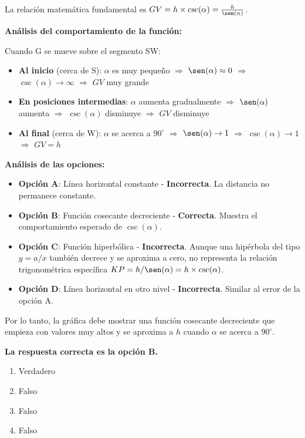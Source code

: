 \documentclass[10pt,a4paper]{article}
\makeatletter
\newenvironment{solution}{\comment}{\endcomment}
\newenvironment{answerlist}{\renewcommand{\labelenumii}{(\alph{enumii})}\begin{enumerate}}{\end{enumerate}}
\newcommand{\exname}[1]{\def\@exname{#1}}
\newcommand{\extype}[1]{\def\@extype{#1}}
\newcommand{\exsolution}[1]{\def\@exsolution{#1}}
\newcommand{\exshuffle}[1]{\def\@exshuffle{#1}}
\newcommand{\exsection}[1]{\def\@exsection{#1}}
\makeatother
\begin{document}
\begin{enumerate}
\begin{solution}

La relación matemática fundamental es $GV = h \times \csc(\alpha) = \frac{h}{\sen(\alpha)}$.

\textbf{Análisis del comportamiento de la función:}

Cuando G se mueve sobre el segmento SW:

\begin{itemize}
\item \textbf{Al inicio} (cerca de S): $\alpha$ es muy pequeño $\Rightarrow$ $\sen(\alpha) \approx 0$ $\Rightarrow$ $\csc(\alpha) \to \infty$ $\Rightarrow$ $GV$ muy grande

\item \textbf{En posiciones intermedias}: $\alpha$ aumenta gradualmente $\Rightarrow$ $\sen(\alpha)$ aumenta $\Rightarrow$ $\csc(\alpha)$ disminuye $\Rightarrow$ $GV$ disminuye

\item \textbf{Al final} (cerca de W): $\alpha$ se acerca a $90^\circ$ $\Rightarrow$ $\sen(\alpha) \to 1$ $\Rightarrow$ $\csc(\alpha) \to 1$ $\Rightarrow$ $GV = h$
\end{itemize}

\textbf{Análisis de las opciones:}

\begin{itemize}
\item \textbf{Opción A}: Línea horizontal constante - \textbf{Incorrecta}. La distancia no permanece constante.
\item \textbf{Opción B}: Función cosecante decreciente - \textbf{Correcta}. Muestra el comportamiento esperado de $\csc(\alpha)$.
\item \textbf{Opción C}: Función hiperbólica - \textbf{Incorrecta}. Aunque una hipérbola del tipo $y = a/x$ también decrece y se aproxima a cero, no representa la relación trigonométrica específica $KP = h/\sen(\alpha) = h \times \csc(\alpha)$.
\item \textbf{Opción D}: Línea horizontal en otro nivel - \textbf{Incorrecta}. Similar al error de la opción A.
\end{itemize}

Por lo tanto, la gráfica debe mostrar una función cosecante decreciente que empieza con valores muy altos y se aproxima a $h$ cuando $\alpha$ se acerca a $90^\circ$.

\textbf{La respuesta correcta es la opción B.}

\begin{answerlist}
  \item Verdadero
  \item Falso
  \item Falso
  \item Falso
\end{answerlist}
\end{solution}

\exname{Trigonometría Punto Móvil}
\extype{schoice}
\exsolution{1000}
\exshuffle{TRUE}
\exsection{Geometría Métrica}

\end{enumerate}
\end{document}
